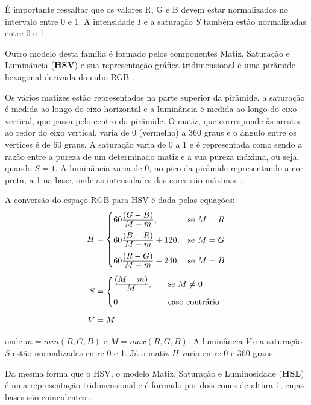 É importante ressaltar que os valores R, G e B devem estar normalizados no intervalo entre 0 e 1. A intensidade $I$ e a saturação $S$ também estão normalizadas entre 0 e 1.

Outro modelo desta família é formado pelos componentes Matiz, Saturação e Luminância (\textbf{HSV}) e sua representação gráfica tridimensional é uma pirâmide hexagonal derivada do cubo RGB \citep{pedrini:08}.

Os vários matizes estão representados na parte superior da pirâmide, a saturação é medida ao longo do eixo horizontal e a luminância é medida ao longo do eixo vertical, que passa pelo centro da pirâmide. O matiz, que corresponde às arestas ao redor do eixo vertical, varia de 0 (vermelho) a 360 graus e o ângulo entre os vértices é de 60 graus. A saturação varia de 0 a 1 e é representada como sendo a razão entre a pureza de um determinado matiz e a sua pureza máxima, ou seja, quando $S = 1$. A luminância varia de 0, no pico da pirâmide representando a cor preta, a 1 na base, onde as intensidades das cores são máximas \citep{pedrini:08}.

A conversão do espaço RGB para HSV é dada pelas equações:
\begin{align}
\label{eq:rgb_para_hsv}
\begin{split}
  H &=  \begin{cases}
            60\frac{\displaystyle (G - B)}{\displaystyle M - m}, & \text{se}\ M = R\\[0.7em]
            60\frac{\displaystyle (B - R)}{\displaystyle M - m} + 120, & \text{se}\ M = G\\[0.7em]
            60\frac{\displaystyle (R - G)}{\displaystyle M - m} + 240, & \text{se}\ M = B
       \end{cases}
  \\[0.5em]
  S &=  \begin{cases}
            \frac{\displaystyle (M - m)}{\displaystyle M}, \quad &\text{se}\ M \neq 0\\[0.7em]
            0, \quad &\text{caso contrário}\\
       \end{cases}
  \\[0.5em]
  V &= M
\end{split}
\end{align}

\noindent onde $m = min(R, G ,B)$ e $M = max(R, G ,B)$. A luminância $V$ e a saturação $S$ estão normalizadas entre 0 e 1. Já o matiz $H$ varia entre 0 e 360 graus.

Da mesma forma que o HSV, o modelo Matiz, Saturação e Luminosidade (\textbf{HSL}) é uma representação tridimensional e é formado por dois cones de altura 1, cujas bases são coincidentes \citep{pedrini:08}.

